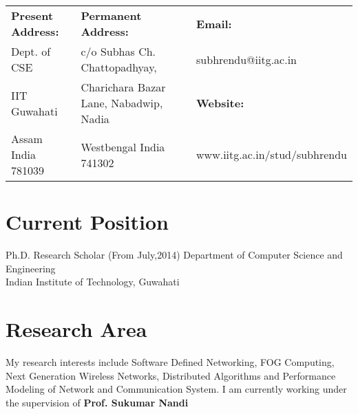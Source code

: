 \documentclass{res}
\begin{document}
 


%
%                                  
\begin{resume}
	\begin{table}[h]
	\centering
	\begin{tabular}{|lll|}
	\hline
	{\bf Present Address:}    & {\bf Permanent Address:}        					&	{\bf Email:}               \\
	Dept. of CSE       				& c/o Subhas Ch. Chattopadhyay, 					&	subhrendu@iitg.ac.in         \\
	IIT Guwahati       			& Charichara Bazar Lane, Nabadwip, Nadia  &	{\bf Website:}  \\
	Assam India 781039 		& Westbengal  India 741302 							&	www.iitg.ac.in/stud/subhrendu \\ \hline
	\end{tabular}
	\end{table}
 \noindent\makebox[\linewidth]{\rule{\textwidth}{0.4pt}}
\section{Current Position}          
	Ph.D. Research Scholar  (From July,2014)  
    Department of Computer Science and Engineering\\
    Indian Institute of Technology, Guwahati
\section{Research Area}    
 		My research interests include Software Defined Networking, FOG Computing, Next Generation Wireless Networks, Distributed Algorithms and Performance Modeling of Network and Communication System. I am currently working under the supervision of {\bf Prof. Sukumar Nandi}

\end{resume}
\end{document}
